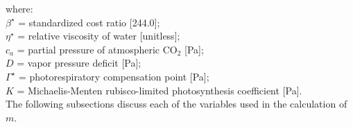 \noindent where:\\
\indent $\beta^\star$ = standardized cost ratio [244.0];\\
\indent $\eta^\star$ = relative viscosity of water [unitless];\\
\indent $c_a$ = partial pressure of atmospheric CO$_2$ [Pa];\\
\indent $D$ = vapor pressure deficit [Pa];\\
\indent $\Gamma^\star$ = photorespiratory compensation point [Pa];\\
\indent $K$ = Michaelis-Menten rubisco-limited photosynthesis coefficient [Pa].\\

\noindent The following subsections discuss each of the variables used in the calculation of $m$.

